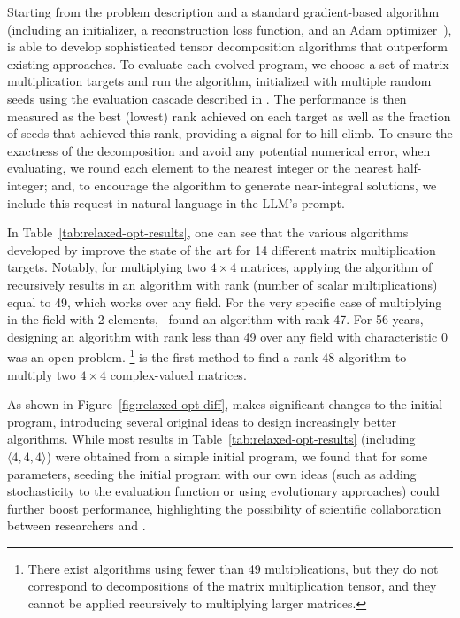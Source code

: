 Starting from the problem description and a standard gradient-based algorithm (including an initializer, a reconstruction loss function, and an Adam optimizer~\cite{kingma2015adam}), \method is able to develop sophisticated tensor decomposition algorithms that outperform existing approaches.
To evaluate each evolved program, we choose a set of matrix multiplication targets and run the algorithm, initialized with multiple random seeds using the evaluation cascade described in . 
The performance is then measured as the best (lowest) rank achieved on each target as well as the fraction of seeds that achieved this rank, providing a signal for \method to hill-climb.
To ensure the exactness of the decomposition and avoid any potential numerical error, when evaluating, we round each element to the nearest integer or the nearest half-integer; and, to encourage the algorithm to generate near-integral solutions, we include this request in natural language in the LLM's prompt.



In Table~\ref{tab:relaxed-opt-results}, one can see that the various algorithms developed by \method improve the state of the art for 14 different matrix multiplication targets.
Notably, for multiplying two $4\times 4$ matrices, applying the algorithm of \citet{strassen1969gaussian} recursively results in an algorithm with rank (number of scalar multiplications) equal to 49, which works over any field.
For the very specific case of multiplying in the field with 2 elements,~\citet{fawzi2022discovering} found an algorithm with rank 47.
For 56 years, designing an algorithm with rank less than 49 over any field with characteristic 0 was an open problem.%
\footnote{There exist algorithms using fewer than 49 multiplications, but they do not correspond to decompositions of the matrix multiplication tensor, and they cannot be applied recursively to multiplying larger matrices.\vspace{-1em}}
\method is the first method to find a rank-$48$ algorithm to multiply two $4\times 4$ complex-valued matrices.

As shown in Figure~\ref{fig:relaxed-opt-diff}, \method makes significant changes to the initial program, introducing several original ideas to design increasingly better algorithms.
While most results in Table~\ref{tab:relaxed-opt-results} (including $\langle 4, 4, 4 \rangle$) were obtained from a simple initial program, we found that for some parameters, seeding the initial program with our own ideas (such as adding stochasticity to the evaluation function or using evolutionary approaches) could further boost performance, highlighting the possibility of scientific collaboration between researchers and \method. 


